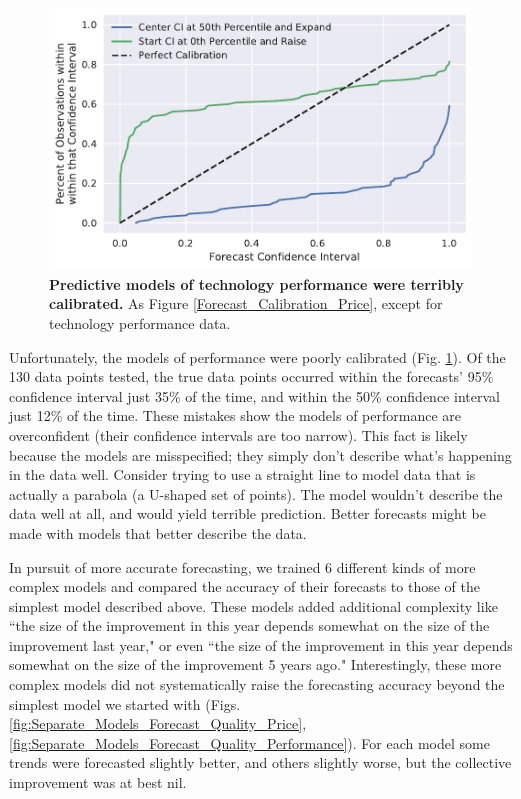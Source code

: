 \documentclass{article}
\begin{document}
\begin{figure}
    \centering
    \includegraphics[width=.75\textwidth]{figs/Forecast_Calibration_Performance.pdf}
    \caption{\textbf{Predictive models of technology performance were terribly calibrated.} As Figure \ref{Forecast_Calibration_Price}, except for technology performance data.}
    \label{Forecast_Calibration_Performance}
\end{figure}

Unfortunately, the models of performance were poorly calibrated (Fig. \ref{Forecast_Calibration_Performance}). Of the 130 data points tested, the true data points occurred within the forecasts' 95\% confidence interval just 35\% of the time, and within the 50\% confidence interval just 12\% of the time. These mistakes show the models of performance are overconfident (their confidence intervals are too narrow). This fact is likely because the models are misspecified; they simply don't describe what's happening in the data well. Consider trying to use a straight line to model data that is actually a parabola (a U-shaped set of points). The model wouldn't describe the data well at all, and would yield terrible prediction. Better forecasts might be made with models that better describe the data.

In pursuit of more accurate forecasting, we trained 6 different kinds of more complex models and compared the accuracy of their forecasts to those of the simplest model described above. These models added additional complexity like ``the size of the improvement in this year depends somewhat on the size of the improvement last year," or even ``the size of the improvement in this year depends somewhat on the size of the improvement 5 years ago." Interestingly, these more complex models did not systematically raise the forecasting accuracy beyond the simplest model we started with (Figs.
\ref{fig:Separate_Models_Forecast_Quality_Price}, \ref{fig:Separate_Models_Forecast_Quality_Performance}). For each model some trends were forecasted slightly better, and others slightly worse, but the collective improvement was at best nil.
\end{document}
